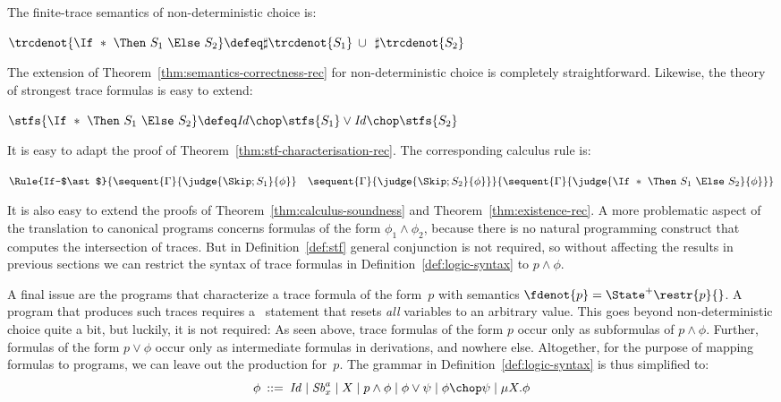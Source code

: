 \documentclass[a4paper,numberwithinsect]{lipics-v2021}
\begin{document}
The finite-trace semantics of non-deterministic choice is:
%
\begin{center}
  $   \trcdenot{\If\ \ast\ \Then\ S_1\ \Else\ S_2}   \defeq  
      \sharp \trcdenot{S_1} \>\cup\>\> 
      \sharp \trcdenot{S_2}      $
\end{center}

The extension of Theorem~\ref{thm:semantics-correctness-rec} for
non-deterministic choice is completely straightforward.
%
Likewise, the theory of strongest trace formulas is easy to extend:
%
\begin{center}
  $\stfs{\If\ \ast\ \Then\ S_1\ \Else\ S_2} \defeq \mathit{Id} \chop
  \stfs{S_1} \lor \mathit{Id} \chop \stfs{S_2}$
\end{center}

It is easy to adapt the proof of
Theorem~\ref{thm:stf-characterisation-rec}.
%
The corresponding calculus rule is:
%
\begin{center}
  $
  \Rule{If-$\ast$}
  {\sequent{\Gamma}{\judge{\Skip; S_1}{\phi}} \quad
   \sequent{\Gamma}{\judge{\Skip; S_2}{\phi}}}
  {\sequent{\Gamma}{\judge{\If\ \ast\ \Then\ S_1\ \Else\ S_2}{\phi}}} 
  $
\end{center}

It is also easy to extend the proofs of
Theorem~\ref{thm:calculus-soundness} and
Theorem~\ref{thm:existence-rec}.
%
A more problematic aspect of the translation to canonical programs
concerns formulas of the form $\phi_1\land\phi_2$, because there is no
natural programming construct that computes the intersection of
traces. But in Definition~\ref{def:stf} general conjunction is not
required, so without affecting the results in previous sections we can
restrict the syntax of trace formulas in
Definition~\ref{def:logic-syntax} to $p\wedge\phi$.

A final issue are the programs that characterize a trace formula of
the form~$p$ with semantics $\fdenot{p}=\State^+\restr{p}{}$. A
program that produces such traces requires a \Any\ statement that
resets \emph{all} variables to an arbitrary value. This goes beyond
non-deterministic choice quite a bit, but luckily, it is not required:
%
As seen above, trace formulas of the form $p$ occur only as
subformulas of $p\wedge\phi$. Further, formulas of the form
$p\vee\phi$ occur only as intermediate formulas in derivations, and
nowhere else.
Altogether, for the purpose of mapping formulas to programs, we can
leave out the production for~$p$.
%
The grammar in Definition~\ref{def:logic-syntax} is thus simplified
to:
%
$$ \phi \>::=\> %
                \mathit{Id} \mid \mathit{Sb}^a_x \mid 
                X \mid 
                p \wedge \phi \mid 
                \phi \vee \psi \mid 
                \phi \chop \psi \mid 
                \mu X. \phi
$$
\end{document}
